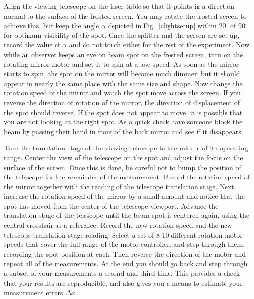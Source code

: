 \documentclass{revtex4}
\begin{document}
Align the viewing telescope on the laser table so that it points in a
direction normal to the surface of the frosted screen.  You may rotate
the frosted screen to achieve this, but keep the angle $\alpha$ depicted
in Fig.~\ref{clightsetup} within 20$^{\circ}$ of 90$^{\circ}$ for optimum
visibility of the spot.  Once the splitter and the screen are set up,
record the value of $\alpha$ and do not touch either for the rest of the
experiment.  Now while an observer keeps an eye on beam spot on the frosted
screen, turn on the rotating mirror motor and set it to spin at a low speed.
As soon as the mirror starts to spin, the spot on the mirror will become
much dimmer, but it should appear in nearly the same place with the
same size and shape.  Now change the rotation speed of the mirror and
watch the spot move across the screen.  If you reverse the direction of
rotation of the mirror, the direction of displacement of the spot should
reverse.  If the spot does not appear to move, it is possible that you
are not looking at the right spot.  As a quick check have someone block
the beam by passing their hand in front of the back mirror and see if it
disappears.

Turn the translation stage of the viewing telescope to the middle of its
operating range.  Center the view of the telescope on the spot and adjust
the focus on the surface of the screen.  Once this is done, be careful not
to bump the position of the telescope for the remainder of the measurement.
Record the rotation speed of the mirror together with the reading of the
telescope translation stage.  Next increase the rotation speed of the mirror
by a small amount and notice that the spot has moved from the center of the
telescope viewport.  Advance the translation stage of the telescope until
the beam spot is centered again, using the central crosshair as a reference.
Record the new rotation speed and the new telescope translation stage reading.
Select a set of 8-10 different rotation motor speeds that cover the full
range of the motor controller, and step through them, recording the spot
position at each.  Then reverse the direction of the motor and repeat all
of the measurements.  At the end you should go back and step through a
subset of your measurements a second and third time.  This provides a
check that your results are reproducible, and also gives you a means to
estimate your measurement errors $\Delta x$.
\end{document}
